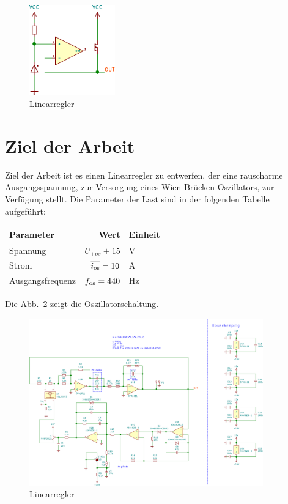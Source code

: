 \begin{figure}
  \centering
  \includegraphics[clip, width=0.33\textwidth]
  {./../common/schaltungen/linearregler/linearregler.pdf}
  \caption{Linearregler}\label{FIG:LINREG}
\end{figure}

\section{Ziel der Arbeit}
Ziel der Arbeit ist es einen Linearregler zu entwerfen, der eine rauscharme
Ausgangsspannung, zur Versorgung eines Wien-Brücken-Oszillators, zur Verfügung
stellt.
Die Parameter der Last sind in der folgenden Tabelle aufgeführt:

\begin{tabularx}{0.9\textwidth}{lrX}
  Parameter&Wert&Einheit\\
  \toprule
  Spannung&$U_{\pm os}\pm 15$&\si{\volt}\\
  Strom&$\overline{i_{\rm os}} = 10$&\si{\ampere}\\
  Ausgangsfrequenz&$f_{\rm os} = 440$&\si{\hertz}\\  
\end{tabularx}

Die Abb.~\ref{FIG:OSZ} zeigt die Oszillatorschaltung.
\begin{figure}
  \centering
  \includegraphics[clip, width=0.9\textwidth]
  {./../common/schaltungen/last.pdf}
  \caption{Linearregler}\label{FIG:OSZ}
\end{figure}

